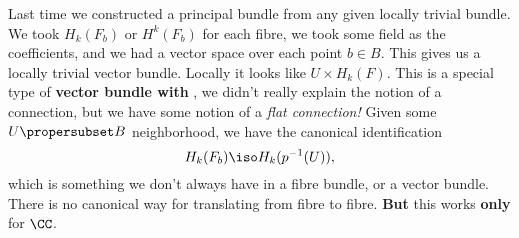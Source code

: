 Last time we constructed a principal bundle from any given
locally trivial bundle. We took $H_{k}(F_{b})$ or $H^{k}(F_{b})$
for each fibre, we took some field as the coefficients, and we
had a vector space over each point $b\in B$. This gives us a
locally trivial vector bundle. Locally it looks like $U\times
H_{k}(F)$. This is a special type of \textbf{vector bundle with
  }, we didn't really explain the notion
of a connection, but we have some notion of a \emph{flat
connection!} Given some $U\propersubset B$ neighborhood, we
have the canonical identification
\begin{equation}
H_{k}(F_{b})\iso H_{k}(p^{-1}(U)),
\end{equation}
which is something we don't always have in a fibre bundle, or a
vector bundle. There is no canonical way for translating from
fibre to fibre. \textbf{But} this works \textbf{only} for $\CC$.

